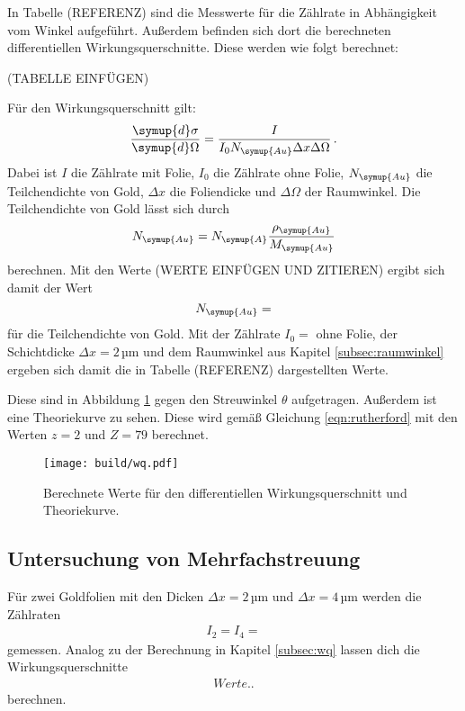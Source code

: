 In Tabelle (REFERENZ) sind die Messwerte für die Zählrate in Abhängigkeit vom
Winkel aufgeführt. Außerdem befinden sich dort die berechneten differentiellen
Wirkungsquerschnitte. Diese werden wie folgt berechnet:

(TABELLE EINFÜGEN)

Für den Wirkungsquerschnitt gilt:
\begin{equation}
  \frac{\symup{d}\sigma}{\symup{d}\Omega} = \frac{I}{I_0  N_\symup{Au} \Delta x \Delta \Omega} \,.
  \label{eqn:wq}
\end{equation}
Dabei ist $I$ die Zählrate mit Folie, $I_0$ die Zählrate ohne Folie, $ N_\symup{Au}$
die Teilchendichte von Gold, $\Delta x$ die Foliendicke und $\Delta \Omega$ der Raumwinkel.
Die Teilchendichte von Gold lässt sich durch
\begin{equation*}
  N_\symup{Au} = N_\symup{A} \frac{\rho_\symup{Au}}{M_\symup{Au}}
\end{equation*}
berechnen. Mit den Werte (WERTE EINFÜGEN UND ZITIEREN) ergibt sich damit der Wert
\begin{equation*}
  N_\symup{Au} =
\end{equation*}
für die Teilchendichte von Gold.
Mit der Zählrate $I_0=$ ohne Folie, der Schichtdicke $\Delta x =2$\,µm und dem Raumwinkel
aus Kapitel \ref{subsec:raumwinkel} ergeben sich damit die in Tabelle (REFERENZ) dargestellten Werte.

Diese sind in Abbildung \ref{fig:wq} gegen den Streuwinkel $\theta$ aufgetragen. Außerdem ist
eine Theoriekurve zu sehen. Diese wird gemäß Gleichung \eqref{eqn:rutherford} mit den
Werten $z=2$ und $Z=79$ berechnet.

\begin{figure}
  \centering
  \texttt{[image: build/wq.pdf]}
  \caption{Berechnete Werte für den differentiellen Wirkungsquerschnitt und Theoriekurve.}
  \label{fig:wq}
\end{figure}


\subsection{Untersuchung von Mehrfachstreuung}
\label{subsec:mehrfach}

Für zwei Goldfolien mit den Dicken $\Delta x=2$\,µm und $\Delta x=4$\,µm werden
die Zählraten
\begin{align*}
  I_2=
  I_4=
\end{align*}
gemessen. Analog zu der Berechnung in Kapitel \ref{subsec:wq} lassen dich die Wirkungsquerschnitte
\begin{align*}
  Werte..
\end{align*}
berechnen.

